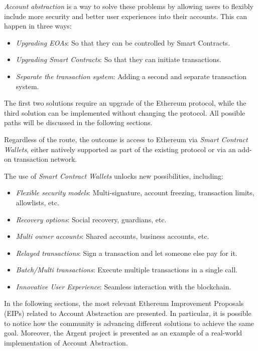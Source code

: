\textit{Account abstraction} is a way to solve these problems by allowing users to flexibly include more security and better user experiences into their accounts. This can happen in three ways: \cite{ethereum-account-abstraction}
\begin{itemize}
    \item \textit{Upgrading EOAs}: So that they can be controlled by Smart Contracts.
    \item \textit{Upgrading Smart Contracts}: So that they can initiate transactions. 
    \item \textit{Separate the transaction system}: Adding a second and separate transaction system.
\end{itemize}

The first two solutions require an upgrade of the Ethereum protocol, while the third solution can be implemented without changing the protocol.\cite{ethereum-account-abstraction} All possible paths will be discussed in the following sections.

Regardless of the route, the outcome is access to Ethereum via \textit{Smart Contract Wallets}, either natively supported as part of the existing protocol or via an add-on transaction network.  \cite{ethereum-account-abstraction}

The use of \textit{Smart Contract Wallets}  unlocks new possibilities, including: \cite{ethereum-account-abstraction}
\begin{itemize}
    \item \textit{Flexible security models}: Multi-signature, account freezing, transaction limits, allowlists, etc.
    \item \textit{Recovery options}: Social recovery, guardians, etc.
    \item \textit{Multi owner accounts}: Shared accounts, business accounts, etc.
    \item \textit{Relayed transactions}: Sign a transaction and let someone else pay for it.
    \item \textit{Batch/Multi transactions}: Execute multiple transactions in a single call.
    \item \textit{Innovative User Experience}: Seamless interaction with the blockchain.
\end{itemize}


In the following sections, the most relevant Ethereum Improvement Proposals (EIPs) related to Account Abstraction are presented. In particular, it is possible to notice how the community is advancing different solutions to achieve the same goal. Moreover, the Argent project is presented as an example of a real-world implementation of Account Abstraction.

